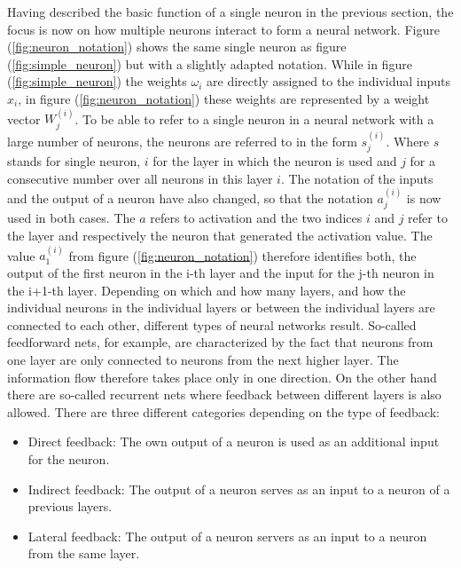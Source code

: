 Having described the basic function of a single neuron in the previous section, the focus is now on how multiple neurons interact to form a neural network. Figure (\ref{fig:neuron_notation}) shows the same single neuron as figure (\ref{fig:simple_neuron}) but with a slightly adapted notation. While in figure (\ref{fig:simple_neuron}) the weights $\omega_i$ are directly assigned to the individual inputs $x_i$, in figure (\ref{fig:neuron_notation}) these weights are represented by a weight vector $W_j^{(i)}$. To be able to refer to a single neuron in a neural network with a large number of neurons, the neurons are referred to in the form $s_j^{(i)}$. Where $s$ stands for single neuron, $i$ for the layer in which the neuron is used and $j$ for a consecutive number over all neurons in this layer $i$. The notation of the inputs and the output of a neuron have also changed, so that the notation $a_j^{(i)}$ is now used in both cases. The $a$ refers to activation and the two indices $i$ and $j$ refer to the layer and respectively the neuron that generated the activation value. The value $a_1^{(i)}$ from figure (\ref{fig:neuron_notation}) therefore identifies both, the output of the first neuron in the i-th layer and the input for the j-th neuron in the i+1-th layer. Depending on which and how many layers, and how the individual neurons in the individual layers or between the individual layers are connected to each other, different types of neural networks result. So-called feedforward nets, for example, are characterized by the fact that neurons from one layer are only connected to neurons from the next higher layer. The information flow therefore takes place only in one direction. On the other hand there are so-called recurrent nets where feedback between different layers is also allowed. There are three different categories depending on the type of feedback:

\begin{itemize}
	\item Direct feedback: The own output of a neuron is used as an additional input for the neuron.
	\item Indirect feedback: The output of a neuron serves as an input to a neuron of a previous layers.
	\item Lateral feedback: The output of a neuron servers as an input to a neuron from the same layer.
\end{itemize}

